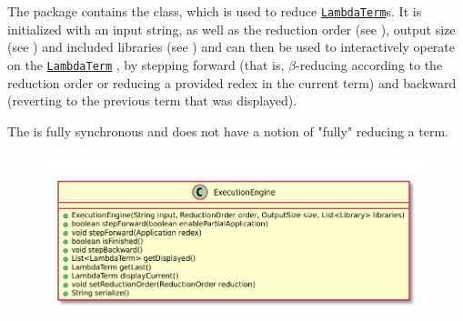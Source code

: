 The \texttt{} package contains the \texttt{}
class, which is used to reduce \texttt{\hyperref[type:edu.kit.wavelength.client.model.term.LambdaTerm]{LambdaTerm}}s.
It is initialized with an input string, as well as the reduction
order (see \texttt{}), output size (see \texttt{})
and included libraries (see \texttt{}) and can then be used to
interactively operate on the \texttt{\hyperref[type:edu.kit.wavelength.client.model.term.LambdaTerm]{LambdaTerm}}
, by stepping forward (that is, $\beta$-reducing according to the reduction order or reducing a provided 
redex in the current term) and backward (reverting to the previous term that was displayed).

The \texttt{} is fully synchronous and does not have a notion
of "fully" reducing a term.

\begin{figure}[H]
	\centering
	\includegraphics[width=\textwidth]{packageDiagrams/modelPackage}
\end{figure}
